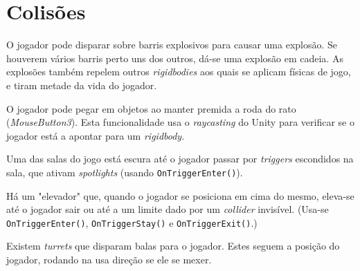 \documentclass{article}
\begin{document}
    \section*{Colisões}
        \par
        O jogador pode disparar sobre barris explosivos para causar uma explosão. Se houverem vários barris perto uns dos outros, dá-se uma explosão em cadeia. As explosões também repelem outros \textit{rigidbodies} aos quais se aplicam físicas de jogo, e tiram metade da vida do jogador.
        \par
        O jogador pode pegar em objetos ao manter premida a roda do rato (\textit{MouseButton3}). Esta funcionalidade usa o \textit{raycasting} do Unity para verificar se o jogador está a apontar para um \textit{rigidbody}.
        \par
        Uma das salas do jogo está escura até o jogador passar por \textit{triggers} escondidos na sala, que ativam \textit{spotlights} (usando \texttt{OnTriggerEnter()}).
        \par
        Há um "elevador" que, quando o jogador se posiciona em cima do mesmo, eleva-se até o jogador sair ou até a um limite dado por um \textit{collider} invisível. (Usa-se \texttt{OnTriggerEnter()}, \texttt{OnTriggerStay()} e \texttt{OnTriggerExit()}.)
        \par
        Existem \textit{turrets} que disparam balas para o jogador. Estes seguem a posição do jogador, rodando na usa direção se ele se mexer.
\end{document}
